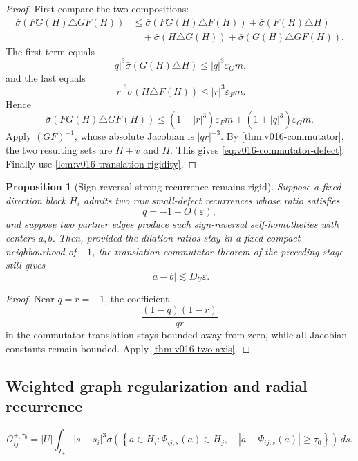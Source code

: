 \documentclass[10pt]{article}
\newtheorem{proposition}[theorem]{Proposition}
\begin{document}
\begin{proof}
First compare the two compositions:
\[
\begin{aligned}
\bar\sigma(FG(H)\triangle GF(H))
&\le
\bar\sigma(FG(H)\triangle F(H))
+
\bar\sigma(F(H)\triangle H)\\
&\quad+
\bar\sigma(H\triangle G(H))
+
\bar\sigma(G(H)\triangle GF(H)).
\end{aligned}
\]
The first term equals
\[
|q|^3\bar\sigma(G(H)\triangle H)
\le
|q|^3\varepsilon_Gm,
\]
and the last equals
\[
|r|^3\bar\sigma(H\triangle F(H))
\le
|r|^3\varepsilon_Fm.
\]
Hence
\[
\bar\sigma(FG(H)\triangle GF(H))
\le
\left(
1+|r|^3
\right)\varepsilon_Fm
+
\left(
1+|q|^3
\right)\varepsilon_Gm.
\]
Apply \((GF)^{-1}\), whose absolute Jacobian is \(|qr|^{-3}\).  By
\cref{thm:v016-commutator}, the two resulting sets are \(H+v\) and \(H\).  This gives
\eqref{eq:v016-commutator-defect}.  Finally use
\cref{lem:v016-translation-rigidity}.
\end{proof}

\begin{proposition}[Sign-reversal strong recurrence remains rigid]
\label{prop:v017-sign-reversal-rigid}
Suppose a fixed direction block \(H_i\) admits two raw small-defect recurrences whose ratio satisfies
\[
q=-1+O(\varepsilon),
\]
and suppose two partner edges produce such sign-reversal self-homotheties with centers \(a,b\).
Then, provided the dilation ratios stay in a fixed compact neighbourhood of \(-1\), the
translation-commutator theorem of the preceding stage still gives
\begin{equation}
\label{eq:v017-sign-reversal-rigid}
\boxed{
|a-b|
\lesssim
D_U\varepsilon.
}
\end{equation}
\end{proposition}

\begin{proof}
Near \(q=r=-1\), the coefficient
\[
\frac{(1-q)(1-r)}{qr}
\]
in the commutator translation stays bounded away from zero, while all Jacobian constants remain
bounded.  Apply
\cref{thm:v016-two-axis}.
\end{proof}

\subsection{Weighted graph regularization and radial recurrence}

\begin{equation}
\label{eq:v029-fixed-angle-overlap}
\boxed{
\mathscr O_{ij}^{+,\tau_0}
=
|U|
\int_{I_+}
|s-s_i|^3
\sigma\left(
\left\{
a\in H_i:
\Psi_{ij,s}(a)\in H_j,
\quad
|a-\Psi_{ij,s}(a)|\ge\tau_0
\right\}
\right)
\,ds.
}
\end{equation}
\end{document}
